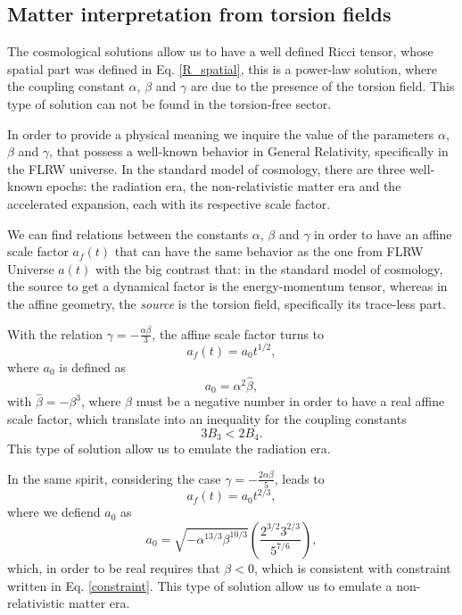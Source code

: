 \subsection{Matter interpretation from torsion fields}

The cosmological solutions allow us to have a well defined Ricci tensor, whose
spatial part was defined in Eq. \eqref{R_spatial}, this is a power-law solution,
where the coupling constant $\alpha$, $\beta$ and $\gamma$ are due to the presence 
of the torsion field. This type of solution can not be found in the torsion-free sector.

In order to provide a physical meaning we inquire the value of the parameters $\alpha$, 
$\beta$ and $\gamma$, that possess a well-known behavior in General Relativity, 
specifically in the FLRW universe. In the standard model of cosmology, there are
three well-known epochs: the radiation era, the non-relativistic matter era and the
accelerated expansion, each with its respective scale factor. 

We can find relations between the constants $\alpha$, $\beta$ and $\gamma$ in order
to have an affine scale factor $a_f(t)$ that can have the same behavior as the one from
FLRW Universe $a(t)$ with the big contrast that: in the standard model of cosmology,
the source to get a dynamical factor is the energy-momentum tensor, whereas in the
affine geometry, the \textit{source} is the torsion field, specifically its trace-less
part.

With the relation $\gamma = -\frac{\alpha\beta}{3}$, the affine scale factor turns to
\begin{equation}
    a_f(t) = a_0 t^{1/2},
\end{equation}
where $a_0$ is defined as 
\begin{equation}
    a_0 = \alpha^2 \hat{\beta},
\end{equation}
with $\hat{\beta} = -\beta^3$, where $\beta$ must be a negative number in order to have 
a real affine scale factor, which translate into an inequality for the coupling constants
\begin{equation}
    \label{constraint}
    3B_3 < 2B_4.
\end{equation}
This type of solution allow us to emulate the radiation era. 

In the same spirit, considering the case $\gamma = -\frac{2\alpha\beta}{5}$, leads to
\begin{equation}
    a_f(t) = a_{0}t^{2/3},
\end{equation}
where we defiend $a_0$ as 
\begin{equation}
    a_0 = \sqrt{-\alpha^{13/3}\beta^{10/3}}\left(\frac{2^{3/2}3^{2/3}}{5^{7/6}}\right),
\end{equation}    
which, in order to be real requires that $\beta <0$, which is consistent with constraint 
written in Eq. \eqref{constraint}. This type of solution allow us to emulate a non-relativistic 
matter era.

